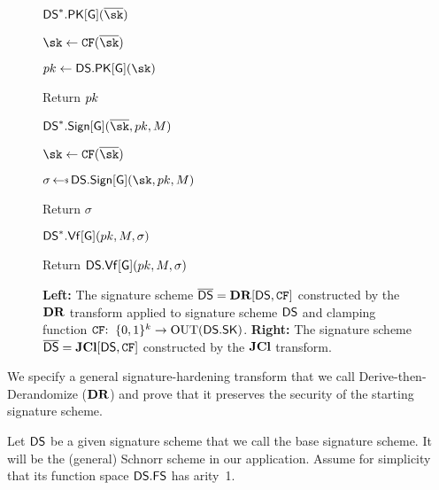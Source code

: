 \begin{figure}[t]
{\begin{algorithm-subsequent}{$\jDS.\MakePK[\GH](\osk)$}
  \item $\sk \gets \CFEDSA(\osk)$ 
  \item $\pk \gets \DS.\MakePK[\GH](\sk)$ 
  \item Return $pk$
  \end{algorithm-subsequent}
  
  \begin{algorithm-subsequent}{$\jDS.\Sign[\GH](\osk, \pk, \msg)$}
\item $\sk \gets \CFEDSA(\osk)$  
\item $\sigma \getsr \DS.\Sign[\GH](\sk,\pk,\msg)$ 
\item  Return $\sigma$
  \end{algorithm-subsequent}

  \begin{algorithm-subsequent}{$\mathsf{DS}^*.\mathsf{Vf}[\mathsf{G}](pk, {M}, \sigma)$}
    \item Return $\mathsf{DS}.\mathsf{Vf}[\mathsf{G}](pk,{M},\sigma)$
  \end{algorithm-subsequent}  \vspace{2pt}
 }
 
 
\vspace{-8pt}
\caption{\textbf{Left:} The signature scheme $\overline{\mathsf{DS}} = \mathbf{DR}[\mathsf{DS},\mathtt{CF}]$ constructed by the $\mathbf{DR}$ transform applied to signature scheme $\mathsf{DS}$ and clamping function $\mathtt{CF}{:\;\;}\{0,1\}^k\to\mathrm{OUT}(\mathsf{DS}.\mathsf{SK})$.  \textbf{Right:} The signature scheme $\overline{\mathsf{DS}} = \mathbf{JCl}[\mathsf{DS},\mathtt{CF}]$ constructed by the $\mathbf{JCl}$ transform.}
\label{fig-dd}
\hrulefill
\vspace{-10pt}
\end{figure}


We specify a general signature-hardening transform that we call Derive-then-Derandomize ($\mathbf{DR}$) and prove that it preserves the security of the starting signature scheme.


 Let $\mathsf{DS}$ be a given signature scheme that we call the base signature scheme. It will be the (general) Schnorr scheme in our application. Assume for simplicity that its function space $\mathsf{DS}.\mathsf{FS}$ has arity~1.

